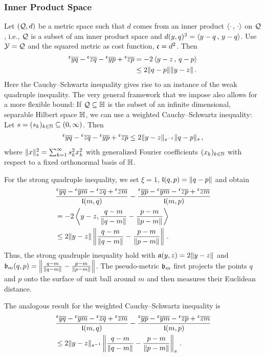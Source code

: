 \subsubsection{Inner Product Space}\label{sssec:inner_product_space}
%
Let $(\mathcal{Q}, d)$ be a metric space such that $d$ comes from an inner product $\left\langle\cdot\,,\, \cdot\right\rangle$ on $\mathcal{Q}$, i.e., $\mathcal{Q}$ is a subset of am inner product space and $d(y,q)^2 = \left\langle y-q\,,\, y-q\right\rangle$. Use $\mathcal{Y} = \mathcal{Q}$ and the squared metric as cost function, $\mathfrak{c} = d^2$. Then
%
\begin{align*}
	\olc yq- \olc zq -\olc yp+\olc zp &= -2\ip{y-z}{q-p} \\&\leq 2\normof{q-p}\normof{y-z}
	\eqfs
\end{align*} 
%
Here the Cauchy--Schwartz inequality gives rise to an instance of the weak quadruple inequality.
The very general framework that we impose also allows for a more flexible bound:
If $\mathcal{Q} \subseteq \mathbb{H}$ is the subset of an infinite dimensional, separable Hilbert space $\mathbb{H}$, we can use a weighted Cauchy--Schwartz inequality:
Let $s = (s_k)_{k\in\mathbb{N}} \subseteq (0,\infty)$. Then
\begin{align*}
	\olc yq- \olc zq -\olc yp+\olc zp \leq 2 \normof{y-z}_{s^{-1}} \normof{q-p}_s 
	\eqcm
\end{align*} 
where $\Vert x \Vert^2_s = \sum_{k=1}^\infty s_k^2 x_k^2$ with generalized Fourier coefficients $(x_k)_{k\in\mathbb{N}}$ with respect to a fixed orthonormal basis of $\mathbb{H}$.

For the strong quadruple inequality, we set $\xi=1$, $\mathfrak{l}(q,p) = \Vert q-p \Vert$ and obtain
\begin{align*}
	&\frac{\olc yq- \olc ym- \olc zq + \olc zm}{\mf l(m,q)} - \frac{\olc yp- \olc ym- \olc zp + \olc zm}{\mf l(m,p)}
	\\&=
	-2\left\langle y-z, \frac{q-m}{\normof{q-m}}-\frac{p-m}{\normof{p-m}} \right\rangle
	\\&\leq
	2\normof{y-z} \normOf{\frac{q-m}{\normof{q-m}}-\frac{p-m}{\normof{p-m}}}
	\eqfs
\end{align*}
Thus, the strong quadruple inequality hold with $\mathfrak{a}(y,z) = 2\Vert y-z \Vert$ and $\mathfrak{b}_m(q,p) = \left\Vert \frac{q-m}{\Vert q-m \Vert}-\frac{p-m}{\Vert p-m \Vert} \right\Vert$. The pseudo-metric $\mathfrak{b}_m$ first projects the points $q$ and $p$ onto the surface of unit ball around $m$ and then measures their Euclidean distance.

The analogous result for the weighted Cauchy--Schwartz inequality is
\begin{align*}
	&\frac{\olc yq- \olc ym- \olc zq + \olc zm}{\mf l(m,q)} - \frac{\olc yp- \olc ym- \olc zp + \olc zm}{\mf l(m,p)}
	\\&\leq
	2\normof{y-z}_{s^{-1}} \normOf{\frac{q-m}{\normof{q-m}}-\frac{p-m}{\normof{p-m}}}_{s}
	\eqfs
\end{align*}
%
%
%
